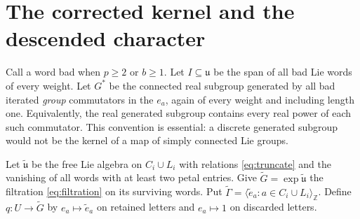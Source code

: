 \documentclass[11pt]{article}
\newcommand{\Z}{\mathbb Z}\newcommand{\N}{\mathbb N}
\newcommand{\lie}{\mathfrak u}\newcommand{\id}{\mathrm{id}}
\begin{document}
\section{The corrected kernel and the descended character}
Call a word bad when $p\geq2$ or $b\geq1$. Let $I\subseteq\lie$ be the
span of all bad Lie words of every weight. Let $G^*$ be the connected real
subgroup generated by all bad iterated \emph{group} commutators in the $e_a$,
again of every weight and including length one. Equivalently, the real
generated subgroup contains every real power of each such commutator.
This convention is essential: a discrete generated subgroup would not be
the kernel of a map of simply connected Lie groups.

Let $\widetilde{\lie}$ be the free Lie algebra on $C_i\cup L_i$ with relations
\eqref{eq:truncate} and the vanishing of all words with at least two petal
entries. Give $\widetilde G=\exp\widetilde{\lie}$ the filtration
\eqref{eq:filtration} on its surviving words. Put
$\widetilde\Gamma=\langle\widetilde e_a:a\in C_i\cup L_i\rangle_{\Z}$.
Define $q:U\to\widetilde G$ by $e_a\mapsto\widetilde e_a$ on retained
letters and $e_a\mapsto1$ on discarded letters.
\end{document}
